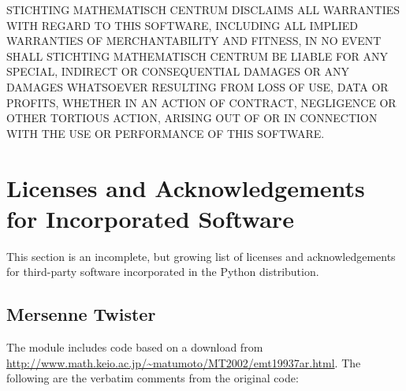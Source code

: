 STICHTING MATHEMATISCH CENTRUM DISCLAIMS ALL WARRANTIES WITH REGARD TO
THIS SOFTWARE, INCLUDING ALL IMPLIED WARRANTIES OF MERCHANTABILITY AND
FITNESS, IN NO EVENT SHALL STICHTING MATHEMATISCH CENTRUM BE LIABLE
FOR ANY SPECIAL, INDIRECT OR CONSEQUENTIAL DAMAGES OR ANY DAMAGES
WHATSOEVER RESULTING FROM LOSS OF USE, DATA OR PROFITS, WHETHER IN AN
ACTION OF CONTRACT, NEGLIGENCE OR OTHER TORTIOUS ACTION, ARISING OUT
OF OR IN CONNECTION WITH THE USE OR PERFORMANCE OF THIS SOFTWARE.


\section{Licenses and Acknowledgements for Incorporated Software}

This section is an incomplete, but growing list of licenses and
acknowledgements for third-party software incorporated in the
Python distribution.


\subsection{Mersenne Twister}

The  module includes code based on a download from
\url{http://www.math.keio.ac.jp/~matumoto/MT2002/emt19937ar.html}.
The following are the verbatim comments from the original code:

